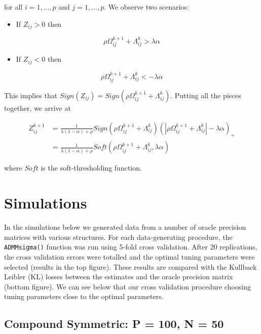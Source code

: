 \documentclass[11pt,]{book}
\providecommand{\tightlist}{%
  \setlength{\itemsep}{0pt}\setlength{\parskip}{0pt}}
\theoremstyle{definition}
\theoremstyle{definition}
\theoremstyle{definition}
\theoremstyle{remark}
\begin{document}
for all \(i = 1,..., p\) and \(j = 1,..., p\). We observe two scenarios:

\begin{itemize}
\tightlist
\item
  If \(Z_{ij} > 0\) then
\end{itemize}

\[ \rho\Omega_{ij}^{k + 1} + \Lambda_{ij}^{k} > \lambda\alpha \]

\begin{itemize}
\tightlist
\item
  If \(Z_{ij} < 0\) then
\end{itemize}

\[ \rho\Omega_{ij}^{k + 1} + \Lambda_{ij}^{k} < -\lambda\alpha \]

This implies that
\(Sign(Z_{ij}) = Sign(\rho\Omega_{ij}^{k + 1} + \Lambda_{ij}^{k})\).
Putting all the pieces together, we arrive at

\begin{align*}
Z_{ij}^{k + 1} &= \frac{1}{\lambda(1 - \alpha) + \rho}Sign\left(\rho\Omega_{ij}^{k + 1} + \Lambda_{ij}^{k}\right)\left( \left| \rho\Omega_{ij}^{k + 1} + \Lambda_{ij}^{k} \right| - \lambda\alpha \right)_{+} \\
&= \frac{1}{\lambda(1 - \alpha) + \rho}Soft\left(\rho\Omega_{ij}^{k + 1} + \Lambda_{ij}^{k}, \lambda\alpha\right)
\end{align*}

where \(Soft\) is the soft-thresholding function.

\hypertarget{simulations}{%
\chapter{Simulations}\label{simulations}}

In the simulations below we generated data from a number of oracle
precision matrices with various structures. For each data-generating
procedure, the \texttt{ADMMsigma()} function was run using 5-fold cross
validation. After 20 replications, the cross validation errors were
totalled and the optimal tuning parameters were selected (results in the
top figure). These results are compared with the Kullback Leibler (KL)
losses between the estimates and the oracle precision matrix (bottom
figure). We can see below that our cross validation procedure choosing
tuning parameters close to the optimal parameters.

\hypertarget{compound-symmetric-p-100-n-50}{%
\section{Compound Symmetric: P = 100, N =
50}\label{compound-symmetric-p-100-n-50}}
\end{document}
